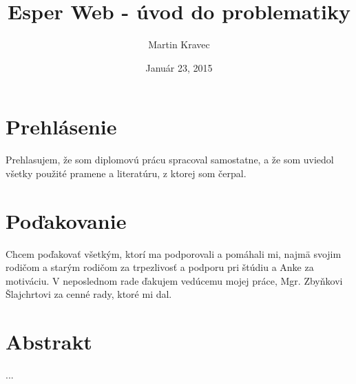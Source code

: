 \documentclass[12pt, a4paper, oneside]{book} %
\begin{document}
\title{Esper Web - úvod do problematiky}
\author{Martin Kravec}
\date{Január 23, 2015}

\frontmatter

\maketitle \thispagestyle{empty} \emptydoublepage

\chapter*{Prehlásenie}
Prehlasujem, že som diplomovú prácu spracoval samostatne, a že som uviedol všetky použité pramene a literatúru, z ktorej som čerpal.

\emptydoublepage

\chapter*{Poďakovanie}
Chcem poďakovať všetkým, ktorí ma podporovali a pomáhali mi, najmä svojim rodičom a starým rodičom za trpezlivosť a podporu pri štúdiu a Anke za motiváciu. V neposlednom rade ďakujem vedúcemu mojej práce, Mgr. Zbyňkovi Šlajchrtovi za cenné rady, ktoré mi dal.

\emptydoublepage


\chapter*{Abstrakt}
...

\end{document}
